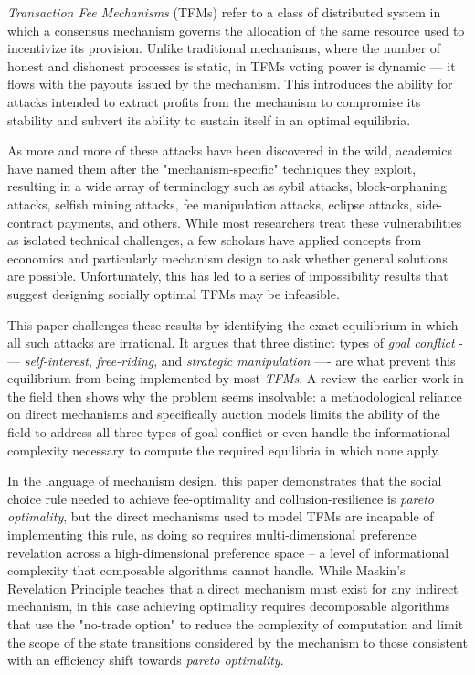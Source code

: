 
\emph{Transaction Fee Mechanisms} (TFMs) refer to a class of distributed system in which a consensus mechanism governs the allocation of the same resource used to incentivize its provision. Unlike traditional mechanisms, where the number of honest and dishonest processes is static, in TFMs voting power is dynamic — it flows with the payouts issued by the mechanism. This introduces the ability for attacks intended to extract profits from the mechanism to compromise its stability and subvert its ability to sustain itself in an optimal equilibria.

As more and more of these attacks have been discovered in the wild, academics have named them after the "mechanism-specific" techniques they exploit, resulting in a wide array of terminology such as sybil attacks, block-orphaning attacks, selfish mining attacks, fee manipulation attacks, eclipse attacks, side-contract payments, and others. While most researchers treat these vulnerabilities as isolated technical challenges, a few scholars have applied concepts from economics and particularly mechanism design to ask whether general solutions are possible. Unfortunately, this has led to a series of impossibility results that suggest designing socially optimal TFMs may be infeasible.

This paper challenges these results by identifying the exact equilibrium in which all such attacks are irrational. It argues that three distinct types of \textit{goal conflict} -— \textit{self-interest}, \textit{free-riding}, and \textit{strategic manipulation} —- are what prevent this equilibrium from being implemented by most \textit{TFMs}. A review the earlier work in the field then shows why the problem seems insolvable: a methodological reliance on direct mechanisms and specifically auction models limits the ability of the field to address all three types of goal conflict or even handle the informational complexity necessary to compute the required equilibria in which none apply.

In the language of mechanism design, this paper demonstrates that the social choice rule needed to achieve fee-optimality and collusion-resilience is \textit{pareto optimality}, but the direct mechanisms used to model TFMs are incapable of implementing this rule, as doing so requires multi-dimensional preference revelation across a high-dimensional preference space -- a level of informational complexity that composable algorithms cannot handle. While Maskin's Revelation Principle teaches that a direct mechanism must exist for any indirect mechanism, in this case achieving optimality requires decomposable algorithms that use the "no-trade option" to reduce the complexity of computation and limit the scope of the state transitions considered by the mechanism to those consistent with an efficiency shift towards \textit{pareto optimality}.

